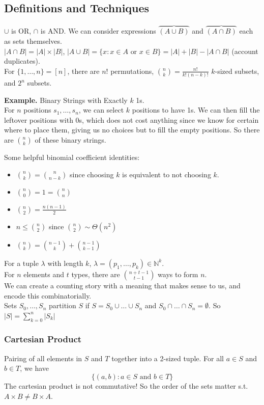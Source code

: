 \documentclass[11pt]{article}
\newenvironment{eg}[1]{
\begin{tcolorbox}[colback = white!15, arc=0pt,outer arc=0pt, colframe = black]
{\color{black} \textbf{Example.} #1} \\[5pt]
}
{
\end{tcolorbox}
}
\newcommand{\nl}{\\[5pt]}
\begin{document}
\subsection{Definitions and Techniques}
$\cup$ is OR, $\cap$ is AND. We can consider expressions $\overbrace{(A \cup B)}$ and $\overbrace{(A \cap B)}$ each as sets themselves.\nl
$|A \cap B| = |A| \times |B|$, $|A \cup B| = \{x : x \in A \text{ or } x \in B\} = |A| + |B| - |A \cap B|$ (account duplicates). \nl
For $\{1,\dots, n\} = [n]$, there are $n!$ permutations, $\binom{n}{k} = \frac{n!}{k!(n-k)!}$ $k$-sized subsets, and $2^n$ subsets. 
\begin{eg}{Binary Strings with Exactly $k$ 1s.}
For $n$ positions $s_1, \dots, s_n$, we can select $k$ positions to have 1s. We can then fill the leftover positions with 0s, which does not cost anything since we know for certain where to place them, giving us no choices but to fill the empty positions. So there are $\binom{n}{k}$ of these binary strings. 
\end{eg}
Some helpful binomial coefficient identities:
\begin{itemize}
  \setlength\itemsep{1pt}
    \item $\binom{n}{k} = \binom{n}{n-k}$ since choosing $k$ is equivalent to not choosing $k$. 
    \item $\binom{n}{0} = 1 = \binom{n}{n}$ 
    \item $\binom{n}{2} = \frac{n(n-1)}{2}$
    \item $n \leq \binom{n}{2}$ since $\binom{n}{2} \sim \Theta(n^2)$ 
    \item $ \binom{n}{k} = \binom{n-1}{k} + \binom{n-1}{k-1}$  
\end{itemize}
For a tuple $\lambda$ with length $k$, $\lambda = (p_1, \dots, p_k) \in \mathbb{N}^k$. \nl
For $n$ elements and $t$ types, there are $\binom{n+t-1}{t-1}$ ways to form $n$. \nl
We can create a counting story with a meaning that makes sense to us, and encode this combinatorially.\nl 
Sets $S_0, \dots, S_n$ partition $S$ if $S = S_0 \cup \dots \cup S_n$ and $S_0 \cap \dots \cap S_n = \emptyset$. So $|S| = \sum_{k = 0}^ n |S_k|$

\subsubsection{Cartesian Product}
 Pairing of all elements in $S$ and $T$ together into a 2-sized tuple. For all $a \in S$ and $b \in T$, we have $$\{(a,b) : a \in S \text{ and } b \in T\}$$
The cartesian product is not commutative! So the order of the sets matter s.t. $A \times B 
\neq B \times A$.
\end{document}

